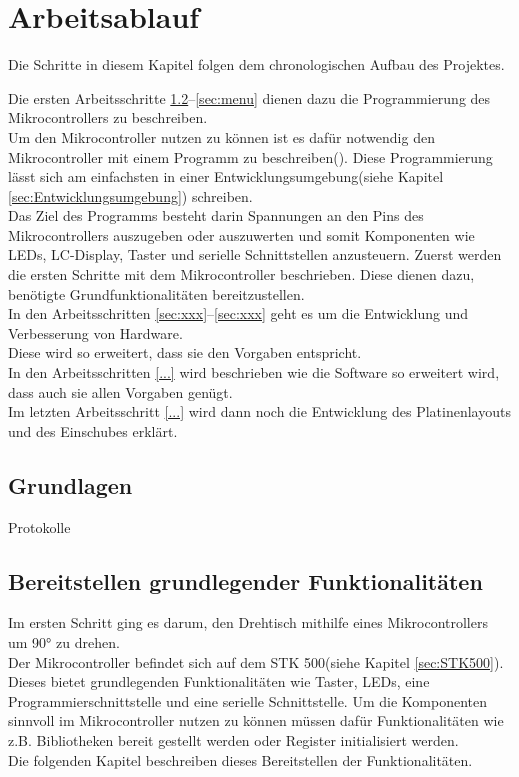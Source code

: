 
\chapter{Arbeitsablauf}
\label{cha:Arbeit}
\begin{Tipp}
Die Schritte in diesem Kapitel folgen dem chronologischen Aufbau des Projektes.
\end{Tipp}
Die ersten Arbeitsschritte \ref{sec:Erste_Schritte}--\ref{sec:menu} dienen dazu die Programmierung des Mikrocontrollers zu beschreiben. \\
Um den Mikrocontroller nutzen zu können ist es dafür notwendig den Mikrocontroller mit einem Programm zu beschreiben(). 
Diese Programmierung lässt sich am einfachsten in einer Entwicklungsumgebung(siehe Kapitel \ref{sec:Entwicklungsumgebung}) schreiben.\\
Das Ziel des Programms besteht darin Spannungen an den Pins des Mikrocontrollers auszugeben oder auszuwerten und somit Komponenten wie LEDs, LC-Display, Taster und serielle Schnittstellen anzusteuern.
Zuerst werden die ersten Schritte mit dem Mikrocontroller beschrieben. Diese dienen dazu, benötigte Grundfunktionalitäten bereitzustellen.\\
In den Arbeitsschritten \ref{sec:xxx}--\ref{sec:xxx} geht es um die Entwicklung und Verbesserung von Hardware.\\
Diese wird so erweitert, dass sie den Vorgaben entspricht.\\
In den Arbeitsschritten \ref{...} wird beschrieben wie die Software so erweitert wird, dass auch sie allen Vorgaben genügt.\\
Im letzten Arbeitsschritt \ref{...} wird dann noch die Entwicklung des Platinenlayouts und des Einschubes erklärt.
\section{Grundlagen}
Protokolle
\section{Bereitstellen grundlegender Funktionalitäten}
\label{sec:Erste_Schritte}
Im ersten Schritt ging es darum, den Drehtisch mithilfe eines Mikrocontrollers um 90° zu drehen.\\
Der Mikrocontroller befindet sich auf dem STK 500(siehe Kapitel \ref{sec:STK500}). Dieses bietet grundlegenden Funktionalitäten wie Taster, LEDs, eine Programmierschnittstelle und eine serielle Schnittstelle.
Um die Komponenten sinnvoll im Mikrocontroller nutzen zu können müssen dafür Funktionalitäten wie z.B. Bibliotheken bereit gestellt werden oder Register initialisiert werden.\\
Die folgenden Kapitel beschreiben dieses Bereitstellen der Funktionalitäten.

